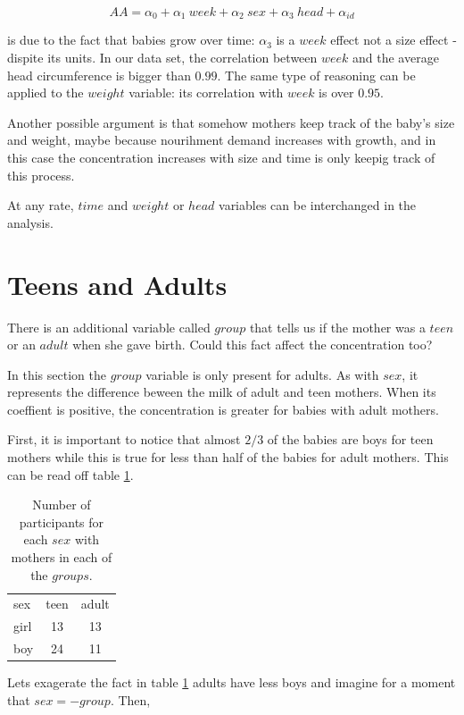 \documentclass[12pt]{article}
\begin{document}
\begin{equation*}
  AA = \alpha_0 + \alpha_1 \ week + \alpha_2 \ sex + \alpha_3 \ head + \alpha_{id}
\end{equation*}

is due to the fact that babies grow over time: $\alpha_3$ is a $week$ effect not a size effect - dispite its units. In our data set, the correlation between $week$ and the average head circumference is bigger than $0.99$. The same type of reasoning can be applied to the $weight$ variable: its correlation with $week$ is over $0.95$.

Another possible argument is that somehow mothers keep track of the baby's size and weight, maybe because nourihment demand increases with growth, and in this case the concentration increases with size and time is only keepig track of this process.

At any rate, $time$ and $weight$ or $head$ variables can be interchanged in the analysis.

\section{Teens and Adults}

There is an additional variable called $group$ that tells us if the mother was a $teen$ or an $adult$ when she gave birth. Could this fact affect the concentration too?

In this section the $group$ variable is only present for adults. As with $sex$, it represents the difference beween the milk of adult and teen mothers. When its coeffient is positive, the concentration is greater for babies with adult mothers.

First, it is important to notice that almost $2/3$ of the babies are boys for teen mothers while this is true for less than half of the babies for adult mothers. This can be read off table \ref{tab:sexgroup}.

\begin{table}[H]
  \centering
  \begin{tabular}{lcc}
    sex & teen & adult \\
    girl & 13 & 13  \\
    boy & 24 & 11
  \end{tabular}
  \caption{Number of participants for each $sex$ with mothers in each of the $groups$.}
  \label{tab:sexgroup}
\end{table}

Lets exagerate the fact in table \ref{tab:sexgroup} adults have less boys and imagine for a moment that $sex = -group$. Then,
\end{document}
